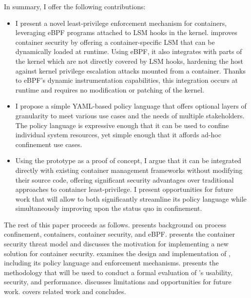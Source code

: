 In summary, I offer the following contributions:
\begin{itemize}
  \item I present \bpfcontain{} a novel least-privilege enforcement mechanism for containers, leveraging eBPF programs attached to LSM hooks in the kernel. \bpfcontain{} improves container security by offering a container-specific LSM that can be dynamically loaded at runtime. Using eBPF, it also integrates with parts of the kernel which are not directly covered by LSM hooks, hardening the host against kernel privilege escalation attacks mounted from a container. Thanks to eBPF's dynamic instrumentation capabilities, this integration occurs at runtime and requires no modification or patching of the kernel.

  \item I propose a simple YAML-based policy language that offers optional layers of granularity to meet various use cases and the needs of multiple stakeholders. The policy language is expressive enough that it can be used to confine individual system resources, yet simple enough that it affords ad-hoc confinement use cases.

  \item Using the \bpfcontain{} prototype as a proof of concept, I argue that it can be integrated directly with existing container management frameworks without modifying their source code, offering significant security advantages over traditional approaches to container least-privilege. I present opportunities for future work that will allow \bpfcontain{} to both significantly streamline its policy language while simultaneously improving upon the status quo in confinement.
\end{itemize}

The rest of this paper proceeds as follows.  presents background on process confinement, containers, container security, and eBPF.  presents the container security threat model and discusses the motivation for implementing a new solution for container security.  examines the design and implementation of \bpfcontain{}, including its policy language and enforcement mechanisms.  presents the methodology that will be used to conduct a formal evaluation of \bpfcontain{}'s usability, security, and performance.  discusses limitations and opportunities for future work.  covers related work and  concludes.
